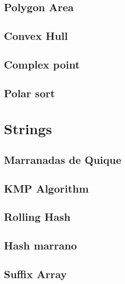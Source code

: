 \documentclass[10pt]{article}
\begin{document}
\begin{multicols*}{2}
\subsection{Polygon Area}

\subsection{Convex Hull}


\subsection{Complex point}


\subsection{Polar sort}


\section{Strings}

\subsection{Marranadas de Quique}


\subsection{KMP Algorithm}


\subsection{Rolling Hash}


\subsection{Hash marrano}


\subsection{Suffix Array}



\end{multicols*}
\end{document}

